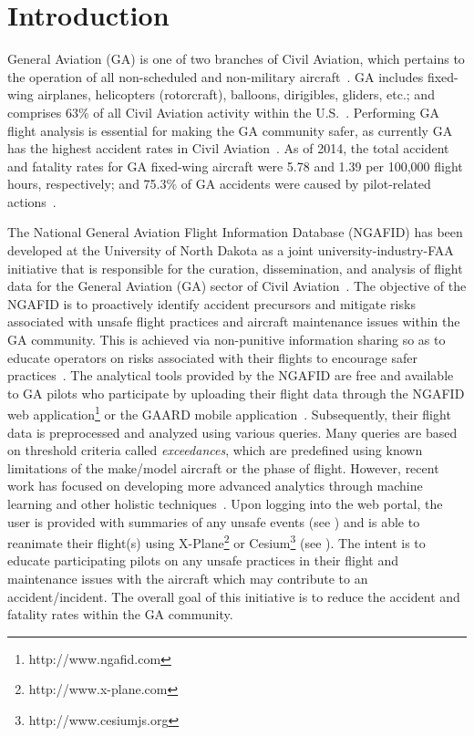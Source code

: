 \chapter{Introduction} \label{ch:introduction}

	General Aviation (GA) is one of two branches of Civil Aviation, which pertains to the operation of all non-scheduled and non-military aircraft~\cite{aopa2009what,allen2006general,federal-aviation-administration2016the-economic,kenny201726th}.  GA includes fixed-wing airplanes, helicopters (rotorcraft), balloons, dirigibles, gliders, etc.; and comprises 63\% of all Civil Aviation activity within the U.S.~\cite{aopa2009what,federal-aviation-administration2016the-economic,shetty2012current}.  Performing GA flight analysis is essential for making the GA community safer, as currently GA has the highest accident rates in Civil Aviation~\cite{kenny201726th,aopa-air-safety-institute20172015-2016}.  As of 2014, the total accident and fatality rates for GA fixed-wing aircraft were 5.78 and 1.39 per 100,000 flight hours, respectively; and 75.3\% of GA accidents were caused by pilot-related actions~\cite{kenny201726th}.

	The National General Aviation Flight Information Database (NGAFID) has been developed at the University of North Dakota as a joint university-industry-FAA initiative that is responsible for the curation, dissemination, and analysis of flight data for the General Aviation (GA) sector of Civil Aviation~\cite{clacharlarge-scale,url_ngafid}.  The objective of the NGAFID is to proactively identify accident precursors and mitigate risks associated with unsafe flight practices and aircraft maintenance issues within the GA community.  This is achieved via non-punitive information sharing so as to educate operators on risks associated with their flights to encourage safer practices~\cite{clacharlarge-scale}.  The analytical tools provided by the NGAFID are free and available to GA pilots who participate by uploading their flight data through the NGAFID web application\footnote{http://www.ngafid.com} or the GAARD mobile application~\cite{url_gaard}.  Subsequently, their flight data is preprocessed and analyzed using various queries.  Many queries are based on threshold criteria called \textit{exceedances}, which are predefined using known limitations of the make/model aircraft or the phase of flight. However, recent work has focused on developing more advanced analytics through machine learning and other holistic techniques~\cite{sophine2014identifying,sophine2016phd,desell2015evolving,elsaid2016vibration,elsaid2016thesis,desell2014evolving}.  Upon logging into the web portal, the user is provided with summaries of any unsafe events (see ) and is able to reanimate their flight(s) using X-Plane\footnote{http://www.x-plane.com} or Cesium\footnote{http://www.cesiumjs.org} (see ).  The intent is to educate participating pilots on any unsafe practices in their flight and maintenance issues with the aircraft which may contribute to an accident/incident. The overall goal of this initiative is to reduce the accident and fatality rates within the GA community.

